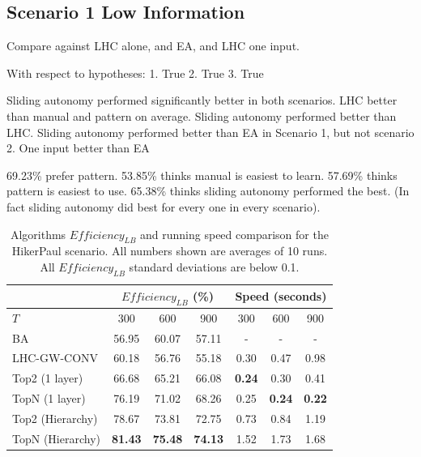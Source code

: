 \documentclass[journal]{IEEEtran}
\begin{document}
\subsection{Scenario 1 Low Information}


Compare against LHC alone, and EA, and LHC one input.



With respect to hypotheses:
1. True
2. True
3. True

Sliding autonomy performed significantly better in both scenarios.
LHC better than manual and pattern on average.
Sliding autonomy performed better than LHC.
Sliding autonomy performed better than EA in Scenario 1, but not scenario 2.
One input better than EA




69.23\% prefer pattern.
53.85\% thinks manual is easiest to learn. 
57.69\% thinks pattern is easiest to use.
65.38\% thinks sliding autonomy performed the best. (In fact sliding autonomy did best for every one in every scenario).


\begin{table}
\caption{Algorithms $\mathit{Efficiency_{LB}}$ and running speed comparison for the HikerPaul scenario. All numbers shown are averages of 10 runs. All $\mathit{Efficiency_{LB}}$ standard deviations are below 0.1.}
	\centering
		\begin{tabular}
			{|l|c|c|c|c|c|c|}
			\hline
			 & \multicolumn{3}{|c|}{$\mathit{Efficiency_{LB}}$ (\%)} & \multicolumn{3}{|c|}{Speed (seconds)} \\
			\hline
			$T$ & 300 & 600 & 900	& 300 & 600 & 900 \\
			\hline
			BA & 56.95 & 60.07 & 57.11 & - & - & - \\
			\hline			
			LHC-GW-CONV & 60.18 & 56.76 & 55.18 & 0.30 & 0.47 & 0.98 \\
			\hline			
			Top2 (1 layer)	& 66.68 & 65.21 & 66.08 & \textbf{0.24} & 0.30 & 0.41 \\ 
			\hline
			TopN (1 layer)	& 76.19 & 71.02 & 68.26 & 0.25 & \textbf{0.24} & \textbf{0.22} \\ 
			\hline
			Top2 (Hierarchy) & 78.67 & 73.81 & 72.75 & 0.73 & 0.84 & 1.19 \\ 
			\hline
			TopN (Hierarchy) & \textbf{81.43} & \textbf{75.48} & \textbf{74.13} & 1.52 & 1.73 & 1.68 \\ 
			\hline			
		\end{tabular}
\label{HikerPaul}
\end{table}
\end{document}
